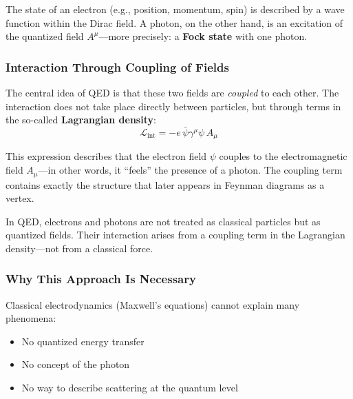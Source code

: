 The state of an electron (e.g., position, momentum, spin) is described by a wave function within the Dirac field. A photon, on the other hand, is an excitation of the quantized field $A^\mu$—more precisely: a \textbf{Fock state} with one photon.

\subsubsection*{Interaction Through Coupling of Fields}
The central idea of QED is that these two fields are \emph{coupled} to each other. The interaction does not take place directly between particles, but through terms in the so-called \textbf{Lagrangian density}:
\[
\mathcal{L}_{\text{int}} = -e \, \bar{\psi} \gamma^\mu \psi \, A_\mu
\]

This expression describes that the electron field $\psi$ couples to the electromagnetic field $A_\mu$—in other words, it “feels” the presence of a photon. The coupling term contains exactly the structure that later appears in Feynman diagrams as a vertex.

\vspace{0.5em}
\begin{tcolorbox}[physikbox, title=Field Theory Instead of Particle Mechanics]
	\label{box:Feldtheorie statt Teilchenmechanik}
	In QED, electrons and photons are not treated as classical particles but as quantized fields. Their interaction arises from a coupling term in the Lagrangian density—not from a classical force.
\end{tcolorbox}

\subsubsection*{Why This Approach Is Necessary}
Classical electrodynamics (Maxwell’s equations) cannot explain many phenomena:
\begin{itemize}
	\item No quantized energy transfer
	\item No concept of the photon
	\item No way to describe scattering at the quantum level
\end{itemize}

